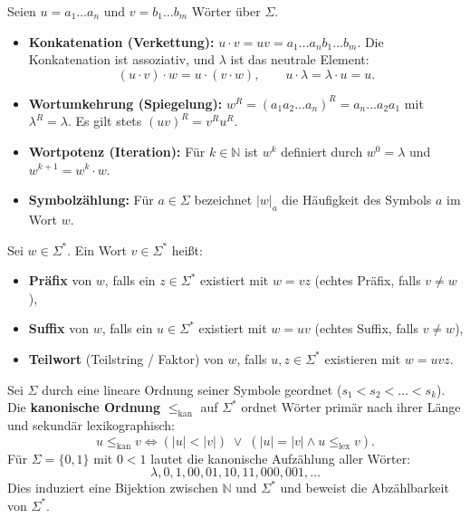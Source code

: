 \begin{definition}
    Seien $u = a_1 \dots a_n$ und $v = b_1 \dots b_m$ Wörter über $\Sigma$.
    \begin{itemize}
        \item \textbf{Konkatenation (Verkettung):}
        $u \cdot v = uv = a_1 \dots a_n b_1 \dots b_m$.
        Die Konkatenation ist assoziativ, und $\lambda$ ist das neutrale Element:
        \[
            (u \cdot v) \cdot w = u \cdot (v \cdot w), \qquad u \cdot \lambda = \lambda \cdot u = u.
        \]
        \item \textbf{Wortumkehrung (Spiegelung):}
        $w^R = (a_1 a_2 \dots a_n)^R = a_n \dots a_2 a_1$ mit $\lambda^R = \lambda$.
        Es gilt stets $(uv)^R = v^R u^R$.
        \item \textbf{Wortpotenz (Iteration):}
        Für $k \in \mathbb{N}$ ist $w^k$ definiert durch $w^0 = \lambda$ und $w^{k+1} = w^k \cdot w$.
        \item \textbf{Symbolzählung:} Für $a \in \Sigma$ bezeichnet $|w|_a$ die Häufigkeit des Symbols $a$ im Wort $w$.
    \end{itemize}
\end{definition}

\begin{definition}
    Sei $w \in \Sigma^*$. Ein Wort $v \in \Sigma^*$ heißt:
    \begin{itemize}
        \item \textbf{Präfix} von $w$, falls ein $z \in \Sigma^*$ existiert mit $w = vz$ (echtes Präfix, falls $v \neq w$),
        \item \textbf{Suffix} von $w$, falls ein $u \in \Sigma^*$ existiert mit $w = uv$ (echtes Suffix, falls $v \neq w$),
        \item \textbf{Teilwort} (Teilstring / Faktor) von $w$, falls $u, z \in \Sigma^*$ existieren mit $w = uvz$.
    \end{itemize}
\end{definition}

\begin{definition}
    Sei $\Sigma$ durch eine lineare Ordnung seiner Symbole geordnet ($s_1 < s_2 < \dots < s_k$). Die \textbf{kanonische Ordnung} $\le_{\mathrm{kan}}$ auf $\Sigma^*$ ordnet Wörter primär nach ihrer Länge und sekundär lexikographisch:
    \[
        u \le_{\mathrm{kan}} v \iff (|u| < |v|) \;\lor\; (|u| = |v| \land u \le_{\mathrm{lex}} v).
    \]
    Für $\Sigma = \{0, 1\}$ mit $0 < 1$ lautet die kanonische Aufzählung aller Wörter:
    \[
        \lambda, 0, 1, 00, 01, 10, 11, 000, 001, \dots
    \]
    Dies induziert eine Bijektion zwischen $\mathbb{N}$ und $\Sigma^*$ und beweist die Abzählbarkeit von $\Sigma^*$.
\end{definition}

